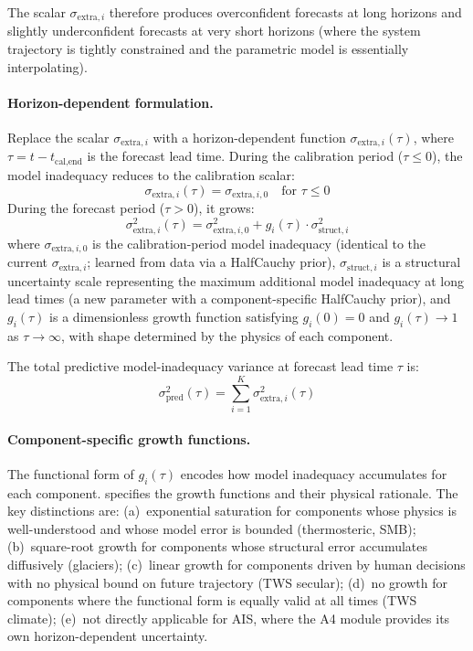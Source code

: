 \documentclass[11pt]{article}
\begin{document}
The scalar $\sigma_{\text{extra},i}$ therefore produces overconfident forecasts at long horizons and slightly underconfident forecasts at very short horizons (where the system trajectory is tightly constrained and the parametric model is essentially interpolating).

\paragraph{Horizon-dependent formulation.}
Replace the scalar $\sigma_{\text{extra},i}$ with a horizon-dependent function $\sigma_{\text{extra},i}(\tau)$, where $\tau = t - t_{\text{cal,end}}$ is the forecast lead time.  During the calibration period ($\tau \leq 0$), the model inadequacy reduces to the calibration scalar:
\begin{equation}
  \sigma_{\text{extra},i}(\tau) = \sigma_{\text{extra},i,0} \quad \text{for } \tau \leq 0
\end{equation}
During the forecast period ($\tau > 0$), it grows:
\begin{equation}
  \sigma_{\text{extra},i}^2(\tau) = \sigma_{\text{extra},i,0}^2 + g_i(\tau) \cdot \sigma_{\text{struct},i}^2
  \label{eq:sigma-extra-horizon}
\end{equation}
where $\sigma_{\text{extra},i,0}$ is the calibration-period model inadequacy (identical to the current $\sigma_{\text{extra},i}$; learned from data via a HalfCauchy prior), $\sigma_{\text{struct},i}$ is a structural uncertainty scale representing the maximum additional model inadequacy at long lead times (a new parameter with a component-specific HalfCauchy prior), and $g_i(\tau)$ is a dimensionless growth function satisfying $g_i(0) = 0$ and $g_i(\tau) \to 1$ as $\tau \to \infty$, with shape determined by the physics of each component.

The total predictive model-inadequacy variance at forecast lead time $\tau$ is:
\begin{equation}
  \sigma_{\text{pred}}^2(\tau) = \sum_{i=1}^{K} \sigma_{\text{extra},i}^2(\tau)
  \label{eq:sigma-pred}
\end{equation}

\paragraph{Component-specific growth functions.}
The functional form of $g_i(\tau)$ encodes how model inadequacy accumulates for each component.   specifies the growth functions and their physical rationale.  The key distinctions are: (a)~exponential saturation for components whose physics is well-understood and whose model error is bounded (thermosteric, SMB); (b)~square-root growth for components whose structural error accumulates diffusively (glaciers); (c)~linear growth for components driven by human decisions with no physical bound on future trajectory (TWS secular); (d)~no growth for components where the functional form is equally valid at all times (TWS climate); (e)~not directly applicable for AIS, where the A4 module provides its own horizon-dependent uncertainty.
\end{document}
